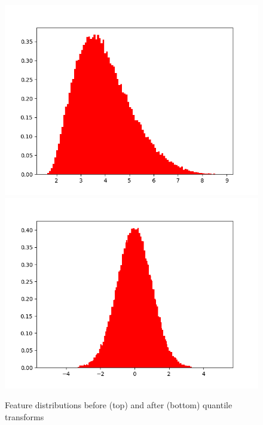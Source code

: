 \begin{figure}[H]
\begin{minipage}{.3\textwidth}
            \centering
            \includegraphics[width=.99\textwidth,trim={3cm 0 0 0},clip]{Chapters/Ch3-Simulations/normalizing_flows/pics/MeetingFigures/Bobby/QT/feature2_noQT.png}
            \includegraphics[width=.99\textwidth,trim={3cm 0 0 0},clip]{Chapters/Ch3-Simulations/normalizing_flows/pics/MeetingFigures/Bobby/QT/feature2.png}
    
        \end{minipage}%
        \caption[Placeholder Short text]{Feature distributions before (top) and after (bottom) quantile transforms}
        \label{fig:16features5}
    \end{figure}

